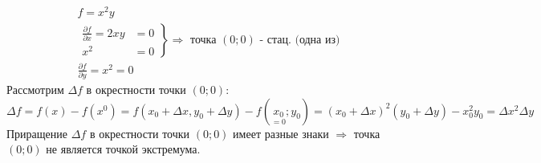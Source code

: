 \documentclass[12pt]{article}
\begin{document}
    \begin{adjustwidth}{1.5em}{1.5em}
        \begin{gather*}
            f = x^2 y\\
            \left.\begin{aligned}
                \frac{\partial f}{\partial x} = 2xy &= 0\\
                x^2 &= 0
            \end{aligned}\right\rbrace \Rightarrow \text{ точка } (0; 0) \text{ - стац. (одна из)}\\
            \frac{\partial f}{\partial y} = x^2 = 0
        \end{gather*}
        Рассмотрим $\Delta f$ в окрестности точки $(0; 0)$:
        \[ \Delta f = f(x) - f(x^0) = f(x_0 + \Delta x, y_0 + \Delta y) - f(\underset{= 0}{x_0};y_0) = (x_0 + \Delta x)^2 (y_0 + \Delta y) - x^2_0 y_0 = \boxed{\Delta x^2 \Delta y} \]
        Приращение $\Delta f$ в окрестности точки $(0; 0)$ имеет разные знаки $\Rightarrow$ точка $(0; 0)$ не является точкой экстремума.
    \end{adjustwidth}
\end{document}
